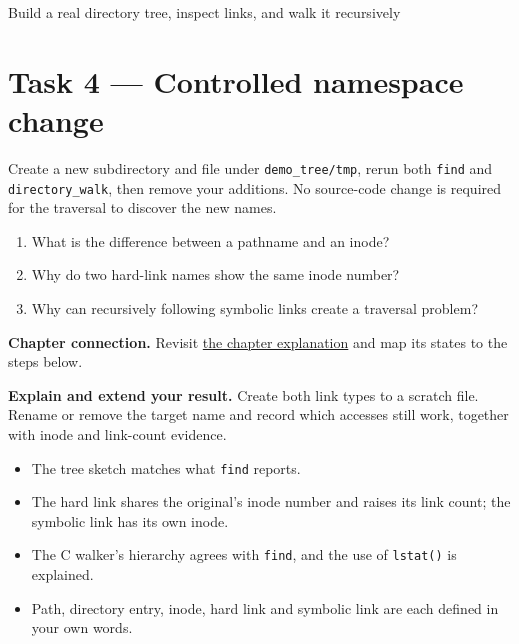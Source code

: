 \begin{labproject}{Build a real directory tree, inspect links, and walk it recursively}
\section*{Task 4 --- Controlled namespace change}
Create a new subdirectory and file under \texttt{demo\_tree/tmp}, rerun both \texttt{find} and \texttt{directory\_walk}, then remove your additions. No source-code change is required for the traversal to discover the new names.

\begin{quickcheck}
\begin{enumerate}
  \item What is the difference between a pathname and an inode?
  \item Why do two hard-link names show the same inode number?
  \item Why can recursively following symbolic links create a traversal problem?
\end{enumerate}
\end{quickcheck}

\textbf{Chapter connection.} Revisit \hyperref[ch:directories]{the chapter explanation} and map its states to the steps below.


\begin{verification}
\textbf{Explain and extend your result.} Create both link types to a scratch file. Rename or remove the target name and record which accesses still work, together with inode and link-count evidence.


\begin{itemize}
  \item The tree sketch matches what \texttt{find} reports.
  \item The hard link shares the original's inode number and raises its link count; the symbolic link has its own inode.
  \item The C walker's hierarchy agrees with \texttt{find}, and the use of \texttt{lstat()} is explained.
  \item Path, directory entry, inode, hard link and symbolic link are each defined in your own words.
\end{itemize}
\end{verification}
\end{labproject}
